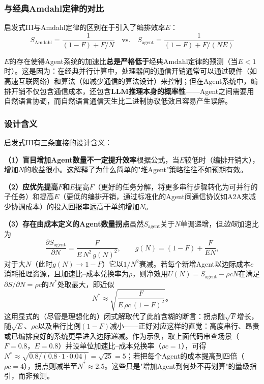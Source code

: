 \subsubsection{与经典Amdahl定律的对比}

启发式III与Amdahl定律的区别在于引入了编排效率$E$：
\begin{equation}
S_{\mathrm{Amdahl}} = \frac{1}{(1-F) + F/N} \quad \text{vs.} \quad S_{\mathrm{agent}} = \frac{1}{(1-F) + F/(NE)}
\end{equation}

$E$的存在使得Agent系统的加速比\textbf{总是严格低于}经典Amdahl定律的预测（当$E < 1$时）。这是因为：在经典并行计算中，处理器间的通信开销通常可以通过硬件（如高速互联网络）和算法（如减少通信的算法设计）来控制；但在Agent系统中，编排开销不仅包含通信成本，还包含\textbf{LLM推理本身的概率性}——Agent之间需要用自然语言协调，而自然语言通信天生比二进制协议低效且容易产生误解。

\subsubsection{设计含义}

启发式III有三条直接的设计含义：

\textbf{（1）盲目增加Agent数量不一定提升效率}根据公式，当$E$较低时（编排开销大），增加$N$的收益很小。这解释了为什么简单的"堆Agent"策略往往不如预期有效。

\textbf{（2）应优先提高$F$和$E$}提高$F$（更好的任务分解，将更多串行步骤转化为可并行的子任务）和提高$E$（更低的编排开销，通过标准化的Agent间通信协议如A2A\cite{agentprotocols2025}来减少协调成本）的投入回报率远高于单纯增加$N$。

\textbf{（3）存在由成本定义的Agent数量拐点}虽然$S_{\mathrm{agent}}$关于$N$单调递增，但\emph{边际}加速比为
\begin{equation}
\frac{\partial S_{\mathrm{agent}}}{\partial N} = \frac{F}{E\,N^{2}\,g(N)^{2}}, \qquad g(N) = (1-F) + \frac{F}{EN},
\end{equation}
对于大$N$（此时$g(N)\to 1-F$）它以$1/N^{2}$衰减。若每个新增Agent以边际成本$c$消耗推理资源，且加速比--成本兑换率为$\rho$，则净效用$U(N) = S_{\mathrm{agent}} - \rho c N$在满足$\partial S/\partial N = \rho c$的$N^*$处取最大，即近似
\begin{equation}
N^{*} \approx \sqrt{\frac{F}{E\,\rho c\,(1-F)^{2}}}。
\end{equation}
这用显式的（尽管是理想化的）闭式解取代了此前含糊的断言：拐点随$\sqrt{F}$增长，随$\sqrt{E}$、$\rho c$以及串行比例$(1-F)$减小——正好对应这样的直觉：高度串行、昂贵或已编排良好的系统更早进入边际递减。作为示例，取上面代码审查场景（$F=0.8$，$E=0.8$）并设单位加速比--成本兑换率（$\rho c = 1$），可得$N^{*} \approx \sqrt{0.8/(0.8 \cdot 1 \cdot 0.04)} = \sqrt{25} = 5$；若把每个Agent的成本提高到四倍（$\rho c = 4$），拐点则减半至$N^{*} \approx 2.5$。这些只是"增加Agent到何处不再划算"的量级指引，而非预测。

